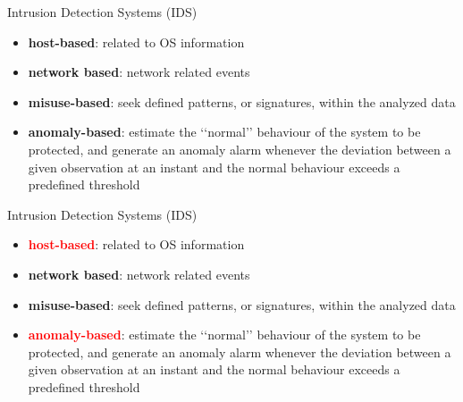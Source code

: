 \documentclass{beamer}
\begin{document}
\begin{frame}{Intrusion Detection Systems (IDS)}
  \begin{itemize}[label=.]
        \item \textbf{host-based}:  related to OS information 
        \item \textbf{network based}:  network related events
  \end{itemize}
  \hspace{1cm}
  \begin{itemize}[label=.]
        \item \textbf{misuse-based}:  seek defined patterns, or signatures, within the analyzed data
        \item \textbf{anomaly-based}:  estimate the ‘‘normal’’ behaviour of the system to be protected, and generate an anomaly alarm whenever the deviation between a given observation at an instant and the normal behaviour exceeds a predefined threshold
\end{itemize}
\end{frame}

\begin{frame}{Intrusion Detection Systems (IDS)}
  \begin{itemize}[label=.]
        \item \textbf{\textcolor{red}{host-based}}:  related to OS information 
        \item \textbf{network based}:  network related events
  \end{itemize}
  \hspace{1cm}
  \begin{itemize}[label=.]
        \item \textbf{misuse-based}:  seek defined patterns, or signatures, within the analyzed data
        \item \textbf{\textcolor{red}{anomaly-based}}:  estimate the ‘‘normal’’ behaviour of the system to be protected, and generate an anomaly alarm whenever the deviation between a given observation at an instant and the normal behaviour exceeds a predefined threshold
\end{itemize}
\end{frame}
\end{document}
